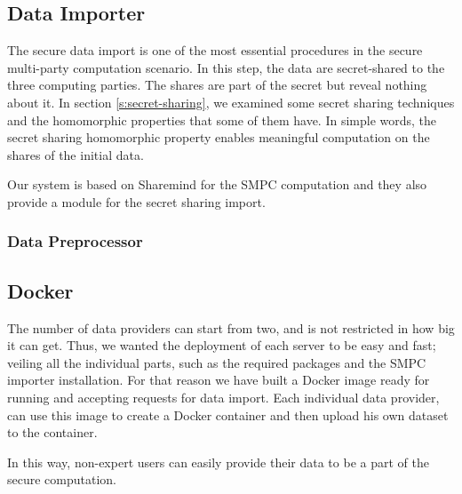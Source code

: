 


\subsection{Data Importer}\label{ss:data-providers-importer}
The secure data import is one of the most essential procedures in the secure multi-party computation scenario.
In this step, the data are secret-shared to the three computing parties.
The shares are part of the secret but reveal nothing about it.
In section \ref{s:secret-sharing}, we examined some secret sharing techniques and the homomorphic properties that some of them have.
In simple words, the secret sharing homomorphic property enables meaningful computation on the shares of the initial data.

Our system is based on Sharemind for the SMPC computation and they also provide a module for the secret sharing import.



\subsubsection{Data Preprocessor}\label{sss:data-providers-preprocessor}




\subsection{Docker}\label{ss:data-providers-docker}
The number of data providers can start from two, and is not restricted in how big it can get.
Thus, we wanted the deployment of each server to be easy and fast; veiling all the individual parts, such as the required packages and the SMPC importer installation.
For that reason we have built a Docker image ready for running and accepting requests for data import.
Each individual data provider, can use this image to create a Docker container and then upload his own dataset to the container.

In this way, non-expert users can easily provide their data to be a part of the secure computation.


